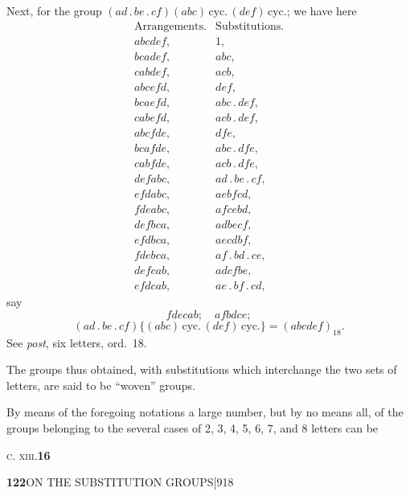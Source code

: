 \documentclass[11pt]{article}
\begin{document}
\hspace{1em} Next, for the group
$(ad\,.\,be\,.\,cf)(abc)\,\text{cyc.}\,(def)\,\text{cyc.}$; we have here
\[
\begin{array}{ll}
\text{Arrangements.} & \text{Substitutions.}\\
abcdef, & 1,\\
bcadef, & abc,\\
cabdef, & acb,\\
abcefd, & def,\\
bcaefd, & abc\,.\,def,\\
cabefd, & acb\,.\,def,\\
abcfde, & dfe,\\
bcafde, & abc\,.\,dfe,\\
cabfde, & acb\,.\,dfe,\\
defabc, & ad\,.\,be\,.\,cf,\\
efdabc, & aebfcd,\\
fdeabc, & afcebd,\\
defbca, & adbecf,\\
efdbca, & aecdbf,\\
fdebca, & af\,.\,bd\,.\,ce,\\
defcab, & adcfbe,\\
efdcab, & ae\,.\,bf\,.\,cd,
\end{array}
\]
say
\[
fdecab;\quad afbdce;
\]
\[
(ad\,.\,be\,.\,cf)\{(abc)\,\text{cyc.}\,(def)\,\text{cyc.}\}=(abcdef)_{18}.
\]
See \emph{post}, six letters, ord.\ 18.

\hspace{1em} The groups thus obtained, with substitutions which interchange
the two sets of letters, are said to be ``woven'' groups.

\hspace{1em} By means of the foregoing notations a large number, but by no
means all, of the groups belonging to the several cases of 2, 3, 4, 5, 6, 7,
and 8 letters can be

\medskip
\noindent\textsc{c. xiii.}\hfill\textbf{16}

\newpage
\noindent\textbf{122}\hfill ON THE SUBSTITUTION GROUPS\hfill[918
\end{document}
